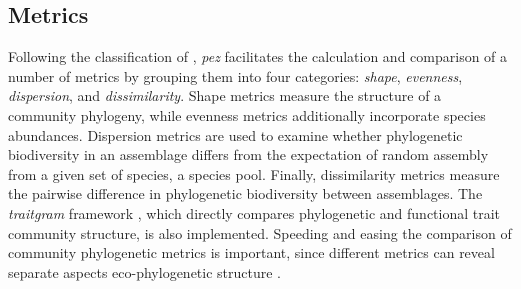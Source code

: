 \documentclass{bioinfo}
\begin{document}
\subsection{Metrics}
Following the classification of \citet{Pearse2014review}, \emph{pez}
facilitates the calculation and comparison of a number of metrics by
grouping them into four categories: \emph{shape}, \emph{evenness},
\emph{dispersion}, and \emph{dissimilarity}. Shape metrics measure the
structure of a community phylogeny, while evenness metrics
additionally incorporate species abundances. Dispersion metrics are
used to examine whether phylogenetic biodiversity in an assemblage
differs from the expectation of random assembly from a given set of
species, a species pool. Finally, dissimilarity metrics measure the
pairwise difference in phylogenetic biodiversity between
assemblages. The \emph{traitgram} framework
\citep{Ackerly2009,Cadotte2013}, which directly compares phylogenetic
and functional trait community structure, is also
implemented. Speeding and easing the comparison of community
phylogenetic metrics is important, since different metrics can reveal
separate aspects eco-phylogenetic structure \citep{Cadotte2010}.
\end{document}
